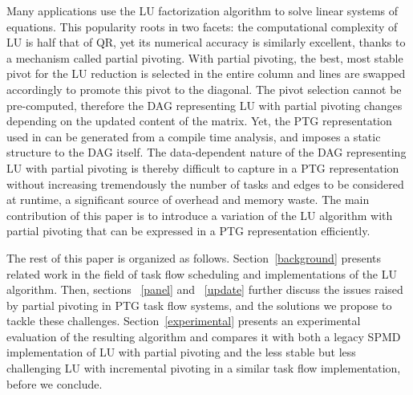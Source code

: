 
Many applications use the LU factorization algorithm to solve
linear systems of equations. This popularity roots in two facets: the
computational complexity of LU is half that of QR, yet its numerical
accuracy is similarly excellent, thanks to a mechanism called partial
pivoting. With partial pivoting, the best, most stable pivot for the LU
reduction is selected in the entire column and lines are swapped
accordingly to promote this pivot to the diagonal. The pivot
selection cannot be pre-computed, therefore
the DAG representing LU with partial pivoting changes depending on the
updated content of the matrix. Yet, the PTG representation used in
\dague can be generated from a compile time analysis, and imposes a static
structure to the DAG itself. The data-dependent nature of the DAG
representing LU with partial pivoting is thereby difficult to capture in
a PTG representation without increasing tremendously the number of tasks
and edges to be considered at runtime, a significant source of overhead
and memory waste. The main contribution of this paper is to introduce a
variation of the LU algorithm with partial pivoting that can be
expressed in a PTG representation efficiently.



The rest of this paper is organized as follows. Section~\ref{background}
presents related work in the field of task flow scheduling and
implementations of the LU algorithm. Then, sections ~\ref{panel} and ~\ref{update} further
discuss the issues raised by partial pivoting in PTG task flow systems, and
the solutions we propose to tackle these challenges.
Section~\ref{experimental} presents an experimental evaluation of the
resulting algorithm and compares it with both a legacy SPMD
implementation of LU with partial pivoting and the less stable but less
challenging LU with incremental pivoting in a similar task flow
implementation, before we conclude.
